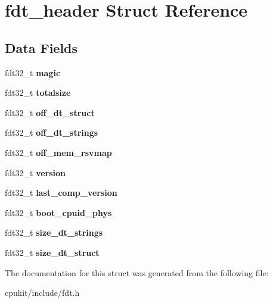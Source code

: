 \hypertarget{structfdt__header}{}\section{fdt\+\_\+header Struct Reference}
\label{structfdt__header}
\subsection*{Data Fields}
\begin{DoxyCompactItemize}
\item 
\mbox{\label{structfdt__header_a65fb0559969843780cf6d3192952af0a}} 
fdt32\+\_\+t {\bfseries magic}
\item 
\mbox{\label{structfdt__header_a142ef62b173b9e13c512bbb231106345}} 
fdt32\+\_\+t {\bfseries totalsize}
\item 
\mbox{\label{structfdt__header_a350b29eb98ea9ab1df4379e19d9f6a08}} 
fdt32\+\_\+t {\bfseries off\+\_\+dt\+\_\+struct}
\item 
\mbox{\label{structfdt__header_a4eb64188c5a8fecc9eb0acac4a0ac002}} 
fdt32\+\_\+t {\bfseries off\+\_\+dt\+\_\+strings}
\item 
\mbox{\label{structfdt__header_aceb981c230e48eea58d9501b2a52fada}} 
fdt32\+\_\+t {\bfseries off\+\_\+mem\+\_\+rsvmap}
\item 
\mbox{\label{structfdt__header_a5df82a5fef43c5d827478d41e78ed649}} 
fdt32\+\_\+t {\bfseries version}
\item 
\mbox{\label{structfdt__header_a230fb2743cc67cc1dd20d7e92fddae1e}} 
fdt32\+\_\+t {\bfseries last\+\_\+comp\+\_\+version}
\item 
\mbox{\label{structfdt__header_ac2746c258f91f98614e281b078863d00}} 
fdt32\+\_\+t {\bfseries boot\+\_\+cpuid\+\_\+phys}
\item 
\mbox{\label{structfdt__header_a64c5ed9e447a81137bf30a6bc3c627ee}} 
fdt32\+\_\+t {\bfseries size\+\_\+dt\+\_\+strings}
\item 
\mbox{\label{structfdt__header_a5d7585b3780d6e983fe0924a0e23ffcb}} 
fdt32\+\_\+t {\bfseries size\+\_\+dt\+\_\+struct}
\end{DoxyCompactItemize}


The documentation for this struct was generated from the following file\+:\begin{DoxyCompactItemize}
\item 
cpukit/include/fdt.\+h\end{DoxyCompactItemize}
